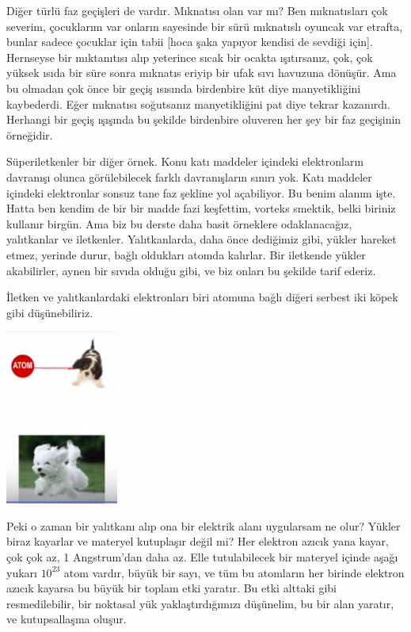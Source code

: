 \documentclass[12pt,fleqn]{article}\usepackage{../../common}
\begin{document}
Diğer türlü faz geçişleri de vardır. Mıknatısı olan var mı? Ben mıknatısları çok
severim, çocuklarım var onların sayesinde bir sürü mıknatıslı oyuncak var
etrafta, bunlar sadece çocuklar için tabii [hoca şaka yapıyor kendisi de sevdiği
  için]. Hernseyse bir mıktanıtısı alıp yeterince sıcak bir ocakta ışıtırsanız,
çok, çok yüksek ısıda bir süre sonra mıknatıs eriyip bir ufak sıvı havuzuna
dönüşür. Ama bu olmadan çok önce bir geçiş ısısında birdenbire küt diye
manyetikliğini kaybederdi. Eğer mıknatısı soğutsanız manyetikliğini pat diye
tekrar kazanırdı. Herhangi bir geçiş ışışında bu şekilde birdenbire oluveren her
şey bir faz geçişinin örneğidir. 

Süperiletkenler bir diğer örnek. Konu katı maddeler içindeki elektronların
davranışı olunca görülebilecek farklı davranışların sınırı yok. Katı maddeler
içindeki elektronlar sonsuz tane faz şekline yol açabiliyor. Bu benim alanım
işte. Hatta ben kendim de bir bir madde fazi keşfettim, vorteks smektik, belki
biriniz kullanır birgün. Ama biz bu derste daha basit örneklere odaklanacağız,
yalıtkanlar ve iletkenler. Yalıtkanlarda, daha önce dediğimiz gibi, yükler
hareket etmez, yerinde durur, bağlı oldukları atomda kalırlar. Bir iletkende
yükler akabilirler, aynen bir sıvıda olduğu gibi, ve biz onları bu şekilde tarif
ederiz.

İletken ve yalıtkanlardaki elektronları biri atomuna bağlı diğeri serbest iki
köpek gibi düşünebiliriz.

\includegraphics[width=10em]{04_07.png}

Peki o zaman bir yalıtkanı alıp ona bir elektrik alanı uygularsam ne olur?
Yükler biraz kayarlar ve materyel kutuplaşır değil mi? Her elektron azıcık
yana kayar, çok çok az, 1 Angstrum'dan daha az. Elle tutulabilecek bir
materyel içinde aşağı yukarı $10^{23}$ atom vardır, büyük bir sayı, ve tüm
bu atomların her birinde elektron azıcık kayarsa bu büyük bir toplam etki
yaratır. Bu etki alttaki gibi resmedilebilir, bir noktasal yük
yaklaştırdığımızı düşünelim, bu bir alan yaratır, ve kutupsallaşma oluşur.
\end{document}
